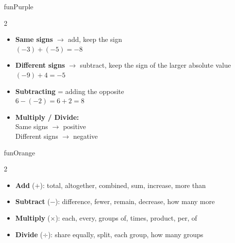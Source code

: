 {\vspace{3mm}

\begin{wbDashBox}{funPurple}
    {\color{funPurple}\faBalanceScale}\;
    \par\vspace{3pt}
    \small
    \begin{multicols}{2}
    \begin{itemize}[leftmargin=*, itemsep=2pt]
        \item \textbf{Same signs} $\to$ add, keep the sign\\
            $(-3)+(-5) = -8$
        \item \textbf{Different signs} $\to$ subtract, keep the sign
            of the larger absolute value\\
            $(-9)+4 = -5$
        \item \textbf{Subtracting} = adding the opposite\\
            $6-(-2)=6+2=8$
        \item \textbf{Multiply / Divide:}\\
            Same signs $\to$ positive\\
            Different signs $\to$ negative
    \end{itemize}
    \end{multicols}
\end{wbDashBox}

\vspace{3mm}

\begin{wbDashBox}{funOrange}
    {\color{funOrange}\faSearch}\;
    \par\vspace{3pt}
    \small
    \begin{multicols}{2}
    \begin{itemize}[leftmargin=*, itemsep=2pt]
        \item \textbf{Add} ($+$): total, altogether, combined, sum, increase, more than
        \item \textbf{Subtract} ($-$): difference, fewer, remain, decrease, how many more
        \item \textbf{Multiply} ($\times$): each, every, groups of, times, product, per, of
        \item \textbf{Divide} ($\div$): share equally, split, each group, how many groups
    \end{itemize}
    \end{multicols}
\end{wbDashBox}

}

\newpage

